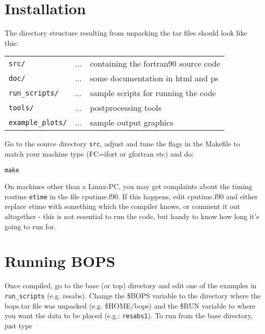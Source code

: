 \documentclass[11pt]{article}
\begin{document}
\section{Installation}
The directory structure resulting from unpacking the tar files should look
like this:

\begin{tabular}{lcl}
\texttt{src/} &	... &	containing the fortran90 source code\\
\texttt{doc/} &	... &	some documentation in html and ps \\
\texttt{run\_scripts/} &	... &	sample scripts for running the code\\
\texttt{tools/} & ... &     postprocessing tools \\
\texttt{example\_plots/} & ... &	sample output graphics
\end{tabular}
	
\medskip

	
Go to the source directory \texttt{src}, adjust and tune the flags in the Makefile to match your machine type (FC=ifort or gfortran etc) and do:

\begin{verbatim}
make
\end{verbatim}

On machines other than a Linux-PC, you may get complaints about the timing routine
\texttt{etime} in the file cputime.f90.  If this happens, edit cputime.f90 and either 
replace etime with something which the compiler knows, or comment it out
altogether - this is not essential to run the code, but handy to know how
long it's going to run for.



\section{Running BOPS}

Once compiled, go to the base (or top) directory and edit one of the examples in
\texttt{run\_scripts} (e.g. resabs).  Change the \$BOPS variable to the directory where the bops.tar file was unpacked (e.g. \$HOME/bops) and the \$RUN variable to where you want the data to be 
placed (e.g.: \texttt{resabs1}).  To run from the base directory, just type
\end{document}
